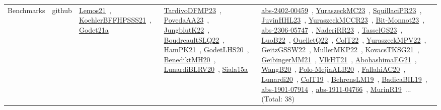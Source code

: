 {\begin{longtable}{lp{3cm}>{\raggedright\arraybackslash}p{6cm}>{\raggedright\arraybackslash}p{6cm}>{\raggedright\arraybackslash}p{8cm}}
Benchmarks & github & \href{works/Lemos21.pdf}{Lemos21}~\cite{Lemos21}, \href{works/KoehlerBFFHPSSS21.pdf}{KoehlerBFFHPSSS21}~\cite{KoehlerBFFHPSSS21}, \href{works/Godet21a.pdf}{Godet21a}~\cite{Godet21a} & \href{works/TardivoDFMP23.pdf}{TardivoDFMP23}~\cite{TardivoDFMP23}, \href{works/PovedaAA23.pdf}{PovedaAA23}~\cite{PovedaAA23}, \href{works/JungblutK22.pdf}{JungblutK22}~\cite{JungblutK22}, \href{works/BoudreaultSLQ22.pdf}{BoudreaultSLQ22}~\cite{BoudreaultSLQ22}, \href{works/HamPK21.pdf}{HamPK21}~\cite{HamPK21}, \href{works/GodetLHS20.pdf}{GodetLHS20}~\cite{GodetLHS20}, \href{works/BenediktMH20.pdf}{BenediktMH20}~\cite{BenediktMH20}, \href{works/LunardiBLRV20.pdf}{LunardiBLRV20}~\cite{LunardiBLRV20}, \href{works/Siala15a.pdf}{Siala15a}~\cite{Siala15a} & \href{works/abs-2402-00459.pdf}{abs-2402-00459}~\cite{abs-2402-00459}, \href{works/YuraszeckMC23.pdf}{YuraszeckMC23}~\cite{YuraszeckMC23}, \href{works/SquillaciPR23.pdf}{SquillaciPR23}~\cite{SquillaciPR23}, \href{works/JuvinHHL23.pdf}{JuvinHHL23}~\cite{JuvinHHL23}, \href{works/YuraszeckMCCR23.pdf}{YuraszeckMCCR23}~\cite{YuraszeckMCCR23}, \href{works/Bit-Monnot23.pdf}{Bit-Monnot23}~\cite{Bit-Monnot23}, \href{works/abs-2306-05747.pdf}{abs-2306-05747}~\cite{abs-2306-05747}, \href{works/NaderiRR23.pdf}{NaderiRR23}~\cite{NaderiRR23}, \href{works/TasselGS23.pdf}{TasselGS23}~\cite{TasselGS23}, \href{works/LuoB22.pdf}{LuoB22}~\cite{LuoB22}, \href{works/OuelletQ22.pdf}{OuelletQ22}~\cite{OuelletQ22}, \href{works/ColT22.pdf}{ColT22}~\cite{ColT22}, \href{works/YuraszeckMPV22.pdf}{YuraszeckMPV22}~\cite{YuraszeckMPV22}, \href{works/GeitzGSSW22.pdf}{GeitzGSSW22}~\cite{GeitzGSSW22}, \href{works/MullerMKP22.pdf}{MullerMKP22}~\cite{MullerMKP22}, \href{works/KovacsTKSG21.pdf}{KovacsTKSG21}~\cite{KovacsTKSG21}, \href{works/GeibingerMM21.pdf}{GeibingerMM21}~\cite{GeibingerMM21}, \href{works/VlkHT21.pdf}{VlkHT21}~\cite{VlkHT21}, \href{works/AbohashimaEG21.pdf}{AbohashimaEG21}~\cite{AbohashimaEG21}, \href{works/WangB20.pdf}{WangB20}~\cite{WangB20}, \href{works/Polo-MejiaALB20.pdf}{Polo-MejiaALB20}~\cite{Polo-MejiaALB20}, \href{works/FallahiAC20.pdf}{FallahiAC20}~\cite{FallahiAC20}, \href{works/Lunardi20.pdf}{Lunardi20}~\cite{Lunardi20}, \href{works/ColT19.pdf}{ColT19}~\cite{ColT19}, \href{works/BehrensLM19.pdf}{BehrensLM19}~\cite{BehrensLM19}, \href{works/BadicaBIL19.pdf}{BadicaBIL19}~\cite{BadicaBIL19}, \href{works/abs-1901-07914.pdf}{abs-1901-07914}~\cite{abs-1901-07914}, \href{works/abs-1911-04766.pdf}{abs-1911-04766}~\cite{abs-1911-04766}, \href{works/MurinR19.pdf}{MurinR19}~\cite{MurinR19}... (Total: 38)\\

\end{longtable}}
